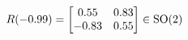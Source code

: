 \documentclass[preview]{standalone}
\begin{document}
\begin{align*}
\special{dvisvgm:raw <g id='unique000'>}R(-0.99) = \begin{bmatrix} 0.55 & 0.83 \\ -0.83 & 0.55 \end{bmatrix} \in \text{SO}(2)\special{dvisvgm:raw </g>}
\end{align*}
\end{document}
